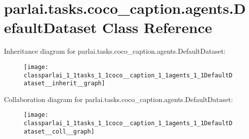 \hypertarget{classparlai_1_1tasks_1_1coco__caption_1_1agents_1_1DefaultDataset}{}\section{parlai.\+tasks.\+coco\+\_\+caption.\+agents.\+Default\+Dataset Class Reference}
\label{classparlai_1_1tasks_1_1coco__caption_1_1agents_1_1DefaultDataset}


Inheritance diagram for parlai.\+tasks.\+coco\+\_\+caption.\+agents.\+Default\+Dataset\+:
\nopagebreak
\begin{figure}[H]
\begin{center}
\leavevmode
\texttt{[image: classparlai\_1\_1tasks\_1\_1coco\_\_caption\_1\_1agents\_1\_1DefaultDataset\_\_inherit\_\_graph]}
\end{center}
\end{figure}


Collaboration diagram for parlai.\+tasks.\+coco\+\_\+caption.\+agents.\+Default\+Dataset\+:
\nopagebreak
\begin{figure}[H]
\begin{center}
\leavevmode
\texttt{[image: classparlai\_1\_1tasks\_1\_1coco\_\_caption\_1\_1agents\_1\_1DefaultDataset\_\_coll\_\_graph]}
\end{center}
\end{figure}
